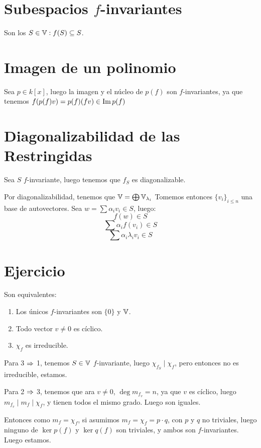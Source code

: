\documentclass{article}
\begin{document}
\section*{Subespacios $f$-invariantes}
Son los $S \in \mathbb{V} : f(S) \subseteq S$.

\section*{Imagen de un polinomio}
Sea $p \in k[x]$, luego la imagen y el núcleo de $p(f)$ son $f$-invariantes, ya que tenemos $f(p(f)v) = p(f)(fv) \in \operatorname{Im} p(f)$

\section*{Diagonalizabilidad de las Restringidas}
Sea $S$ $f$-invariante, luego tenemos que $f_S$ es diagonalizable.

Por diagonalizabilidad, tenemos que $\mathbb{V} = \bigoplus \mathbb{V}_{\lambda_i}$
Tomemos entonces $\{v_i\}_{i \leq n}$ una base de autovectores.
Sea $w = \sum \alpha_iv_i \in S$, luego:
\[
	f(w) \in S
\]
\[
	\sum \alpha_i f(v_i) \in S
\]
\[
	\sum \alpha_i \lambda_i v_i \in S
\]

\section*{Ejercicio}
Son equivalentes:
\begin{enumerate}
	\item Los únicos $f$-invariantes son $\{0\}$ y $\mathbb{V}$.
	\item Todo vector $v \neq 0$ es cíclico.
	\item $\chi_f$ es irreducible.
\end{enumerate}
Para 3 $\Rightarrow$ 1, tenemos $S \in \mathbb{V}$ $f$-invariante, luego $\chi_{f_S} \mid \chi_f$, pero entonces no es irreducible, estamos.

Para 2 $\Rightarrow$ 3, tenemos que ara $v \neq 0$, $\deg m_{f_v} = n$, ya que $v$ es cíclico, luego $m_{f_v} \mid m_f \mid \chi_f$, y tienen todos el mismo grado. Luego son iguales.

Entonces como $m_f = \chi_f$, si asumimos $m_f = \chi_f = p \cdot q$, con $p$ y $q$ no triviales, luego ninguno de $\ker p(f)$ y $\ker q(f)$ son triviales, y ambos son $f$-invariantes. Luego estamos.
\end{document}
